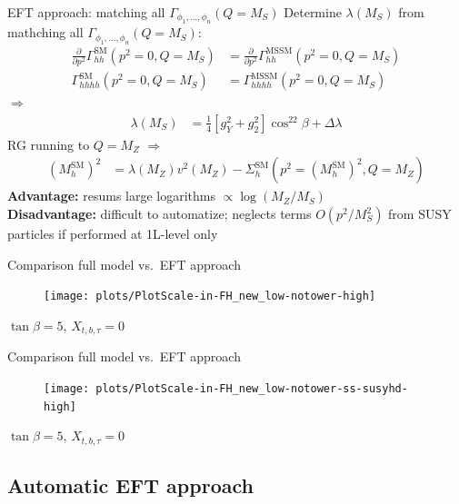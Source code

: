 \documentclass[hyperref={pdfpagelabels=false},ngerman]{beamer}
\renewcommand{\emph}{\textbf}
\newcommand{\SM}{\ensuremath{\text{SM}}}
\begin{document}
\begin{frame}{EFT approach: matching all $\Gamma_{\phi_1,\ldots,\phi_n}(Q = M_S)$}
  Determine $\lambda(M_S)$ from mathching all $\Gamma_{\phi_1,\ldots,\phi_n}(Q = M_S)$:
  \begin{align*}
    \frac{\partial}{\partial p^2}\Gamma_{hh}^{\SM}(p^2 = 0, Q = M_S) &= \frac{\partial}{\partial p^2}\Gamma_{hh}^\text{MSSM}(p^2 = 0, Q = M_S) \\
    \Gamma_{hhhh}^{\SM}(p^2 = 0, Q = M_S) &= \Gamma_{hhhh}^\text{MSSM}(p^2 = 0, Q = M_S)
  \end{align*}
  $\Rightarrow$
  \begin{align*}
    \lambda (M_S) &= \frac{1}{4}\left[g_Y^{2} + g_2^2\right] \cos^22\beta
    + \Delta \lambda
  \end{align*}
  RG running to $Q=M_Z$ $\Rightarrow$
  \begin{align*}
    (M_h^\SM)^2 &= \lambda(M_Z) v^2(M_Z) - \Sigma^\SM_h(p^2 = (M_h^\SM)^2,Q =
    M_Z)
  \end{align*}
  \emph{Advantage:} resums large logarithms $\propto\log(M_Z/M_S)$\\
  \emph{Disadvantage:} difficult to automatize; neglects terms
  $O(p^2/M_S^2)$ from SUSY particles if performed at 1L-level only
\end{frame}

\begin{frame}{Comparison full model vs.\ EFT approach}
  \begin{figure}
    \centering
    \texttt{[image: plots/PlotScale-in-FH\_new\_low-notower-high]}
  \end{figure}
  $\tan\beta = 5$, $X_{t,b,\tau} = 0$
\end{frame}

\begin{frame}{Comparison full model vs.\ EFT approach}
  \begin{figure}
    \centering
    \texttt{[image: plots/PlotScale-in-FH\_new\_low-notower-ss-susyhd-high]}
  \end{figure}
  $\tan\beta = 5$, $X_{t,b,\tau} = 0$
\end{frame}


\subsection{Automatic EFT approach}
\end{document}
